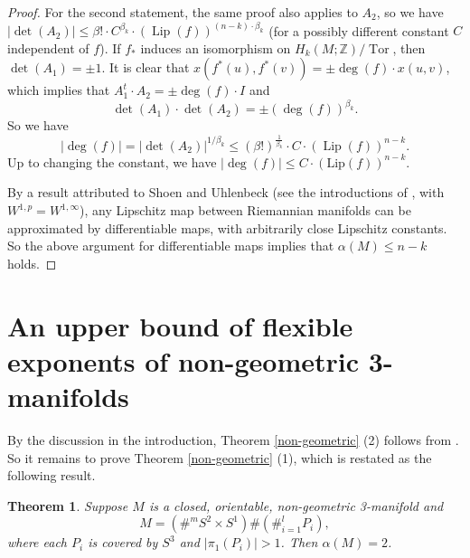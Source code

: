 \documentclass{amsart}
\newcommand{\Z}{\mathbb{Z}}
\newcommand{\lip}{\operatorname{Lip}}
\newtheorem{thm}{Theorem}[section]
\begin{document}
\begin{proof}
    For the second statement, the same proof also applies to $A_2$, so we have $|\det (A_2)|\leqslant \beta!\cdot C^{\beta_k}\cdot (\lip (f))^{{(n-k)}\cdot \beta_k}$ (for a possibly different constant $C$ independent of $f$). If $f_*$ induces an isomorphism on $H_k(M;\Z)/\operatorname{Tor}$, then $\det(A_1)=\pm 1$.
    It is clear that $x(f^*(u),f^*(v))=\pm\deg (f)\cdot x(u,v)$, which implies that $A_1^t\cdot A_2=\pm \deg (f)\cdot I$ and
    \[
        \det (A_1)\cdot \det (A_2)=\pm(\deg (f))^{\beta_k}.
\]
    So we have
    \[
        |\deg (f)|=|\det (A_2)|^{1/\beta_k}\leqslant (\beta!)^{\frac{1}{\beta_k}}\cdot C\cdot (\lip (f))^{n-k}.
    \]
    Up to changing the constant, we have $|\deg(f)|\leq C\cdot (\text{Lip}(f))^{n-k}$.
    
By a result attributed to Shoen and Uhlenbeck (see the introductions of \cite{Be, Ha}, with $W^{1,p}=W^{1,\infty}$), any Lipschitz map between Riemannian manifolds can be approximated by differentiable maps, with arbitrarily close Lipschitz constants. So the above argument for differentiable maps implies that $\alpha(M)\leq n-k$ holds.
\end{proof}


   



  





\section{An upper bound of flexible exponents of non-geometric 3-manifolds}\label{upperbound}


By the discussion in the introduction, Theorem \ref{non-geometric} (2) follows from \cite[Corollary 4.3]{Wang}. So it remains to prove Theorem \ref{non-geometric} (1), which is restated as the following result. 

\begin{thm}\label{nongeometric}
    Suppose $M$ is a closed, orientable, non-geometric 3-manifold and  \[
        M=(\#^mS^2\times S^1)\#(\#_{i=1}^l P_i),
    \] where each $P_i$ is covered by $S^3$ and $|\pi_1(P_i)|>1$.
  Then $\alpha(M)=2$.
    
    \end{thm}
    
\end{document}
